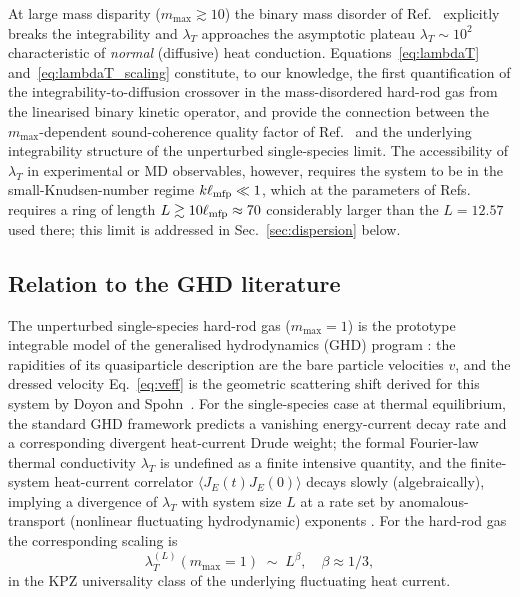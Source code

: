 \documentclass[aps,pre,twocolumn,superscriptaddress,longbibliography,floatfix]{revtex4-2}
\begin{document}
At large mass disparity ($m_{\max}\gtrsim 10$) the binary
mass disorder of Ref.~\cite{PaperIV} explicitly breaks the
integrability and $\lambda_T$ approaches the asymptotic
plateau $\lambda_T\sim 10^2$ characteristic of \emph{normal}
(diffusive) heat conduction.
Equations~\eqref{eq:lambdaT} and~\eqref{eq:lambdaT_scaling}
constitute, to our knowledge, the first quantification of
the integrability-to-diffusion crossover in the
mass-disordered hard-rod gas from the linearised binary
kinetic operator, and provide the connection between the
$m_{\max}$-dependent sound-coherence
quality factor of Ref.~\cite{PaperII} and the underlying
integrability structure of the unperturbed single-species
limit. The accessibility of $\lambda_T$ in experimental
or MD observables, however, requires the system to be in
the small-Knudsen-number regime $k\ell_{\rm mfp}\ll 1$,
which at the parameters of Refs.~\cite{PaperII,PaperIII}
requires a ring of length $L\gtrsim 10\ell_{\rm mfp}\approx 70$
considerably larger than the $L=12.57$ used there; this
limit is addressed in Sec.~\ref{sec:dispersion} below.

\subsection{Relation to the GHD literature}
\label{sec:GHD-comparison}

The unperturbed single-species hard-rod gas
($m_{\max}=1$) is the prototype integrable model of the
generalised hydrodynamics (GHD) program
\cite{DoyonSpohn2017,GHDperspective2025}: the rapidities
of its quasiparticle description are the bare particle
velocities $v$, and the dressed velocity Eq.~\eqref{eq:veff}
is the geometric scattering shift derived for this system
by Doyon and Spohn~\cite{DoyonSpohn2017}. For the
single-species case at thermal equilibrium, the standard
GHD framework predicts a vanishing energy-current decay
rate and a corresponding divergent heat-current Drude
weight; the formal Fourier-law thermal conductivity
$\lambda_T$ is undefined as a finite intensive quantity,
and the finite-system heat-current correlator
$\langle J_E(t)J_E(0)\rangle$ decays slowly (algebraically),
implying a divergence of $\lambda_T$ with system size
$L$ at a rate set by anomalous-transport (nonlinear
fluctuating hydrodynamic) exponents
\cite{Spohn2014,MendlSpohn2013,HubnerDoyon2024}. For the hard-rod gas the
corresponding scaling is
\begin{equation}
\lambda_T^{(L)}(m_{\max}=1)\;\sim\; L^{\beta},
\quad \beta\approx 1/3,
\label{eq:size-scaling}
\end{equation}
in the KPZ universality class of the underlying
fluctuating heat current.
\end{document}
